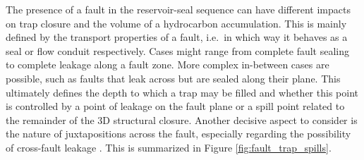         The presence of a fault in the reservoir-seal sequence can have different impacts on trap closure and the volume of a hydrocarbon accumulation. This is mainly defined by the transport properties of a fault, i.e.\ in which way it behaves as a seal or flow conduit respectively. Cases might range from complete fault sealing to complete leakage along a fault zone. More complex in-between cases are possible, such as faults that leak across but are sealed along their plane. This ultimately defines the depth to which a trap may be filled and whether this point is controlled by a point of leakage on the fault plane or a spill point related to the remainder of the 3D structural closure. Another decisive aspect to consider is the nature of juxtapositions across the fault, especially regarding the possibility of cross-fault leakage \citep{van2003lateral}. This is summarized in Figure \ref{fig:fault_trap_spills}.
